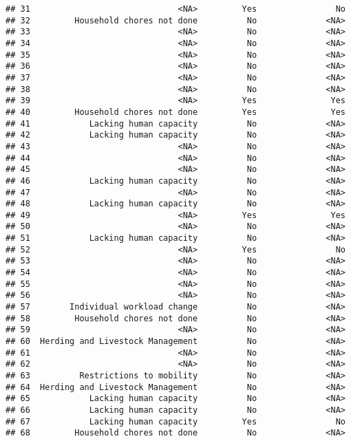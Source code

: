 \documentclass[
]{article}
\begin{document}
\begin{verbatim}
## 31                              <NA>         Yes                No
## 32         Household chores not done          No              <NA>
## 33                              <NA>          No              <NA>
## 34                              <NA>          No              <NA>
## 35                              <NA>          No              <NA>
## 36                              <NA>          No              <NA>
## 37                              <NA>          No              <NA>
## 38                              <NA>          No              <NA>
## 39                              <NA>         Yes               Yes
## 40         Household chores not done         Yes               Yes
## 41            Lacking human capacity          No              <NA>
## 42            Lacking human capacity          No              <NA>
## 43                              <NA>          No              <NA>
## 44                              <NA>          No              <NA>
## 45                              <NA>          No              <NA>
## 46            Lacking human capacity          No              <NA>
## 47                              <NA>          No              <NA>
## 48            Lacking human capacity          No              <NA>
## 49                              <NA>         Yes               Yes
## 50                              <NA>          No              <NA>
## 51            Lacking human capacity          No              <NA>
## 52                              <NA>         Yes                No
## 53                              <NA>          No              <NA>
## 54                              <NA>          No              <NA>
## 55                              <NA>          No              <NA>
## 56                              <NA>          No              <NA>
## 57        Individual workload change          No              <NA>
## 58         Household chores not done          No              <NA>
## 59                              <NA>          No              <NA>
## 60  Herding and Livestock Management          No              <NA>
## 61                              <NA>          No              <NA>
## 62                              <NA>          No              <NA>
## 63          Restrictions to mobility          No              <NA>
## 64  Herding and Livestock Management          No              <NA>
## 65            Lacking human capacity          No              <NA>
## 66            Lacking human capacity          No              <NA>
## 67            Lacking human capacity         Yes                No
## 68         Household chores not done          No              <NA>

\end{verbatim}
\end{document}
